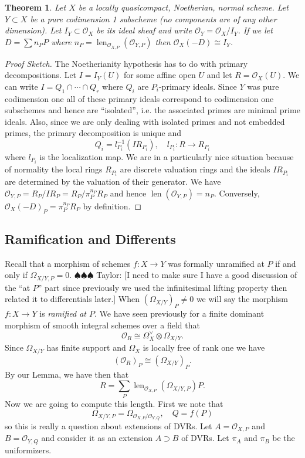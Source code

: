 \documentclass[12pt]{article}
\numberwithin{equation}{section}
\newtheorem{theorem}{Theorem}[subsection]
\theoremstyle{definition}
\theoremstyle{remark}
\newcommand{\Ocal}{\mathcal{O}}
\newcommand{\len}{\operatorname{len}}
\newcommand{\taylor}[1]{{\color{blue} \sf $\spadesuit\spadesuit\spadesuit$ Taylor: [#1]}}
\begin{document}
\begin{theorem}
Let $X$ be a locally quasicompact, Noetherian, normal scheme.
Let $Y \subset X$ be a pure codimension 1 subscheme (no components are of any other dimension).
Let $I_Y \subset \Ocal_X$ be its ideal sheaf and write $\Ocal_Y = \Ocal_X/I_Y$. 
If we let $D = \sum n_P P$ where $n_P = \len_{\Ocal_{X,P}}(\Ocal_{Y,P})$ then $\Ocal_X(-D) \cong I_Y$. 
\end{theorem}
\begin{proof}[Proof Sketch]
	The Noetherianity hypothesis has to do with primary decompositions. 
	Let $I = I_Y(U)$ for some affine open $U$ and let $R=\Ocal_X(U)$.
	We can write $I = Q_1\cap \cdots \cap Q_r$ where $Q_i$ are $P_i$-primary ideals. 
	Since $Y$ was pure codimension one all of these primary ideals correspond to codimension one subschemes and hence are ``isolated'', i.e. the associated primes are minimal prime ideals. 
	Also, since we are only dealing with isolated primes and not embedded primes, the primary decomposition is unique and 
	 $$ Q_i = l_{P_i}^{-1}( I R_{P_i} ), \quad l_{P_i}: R \to R_{P_i} $$
	where $l_{P_i}$ is the localization map.
	We are in a particularly nice situation because of normality the local rings $R_{P_i}$ are discrete valuation rings and the ideals $IR_{P_i}$ are determined by the valuation of their generator.
	We have $\Ocal_{Y,P} = R_P/IR_P=R_P/\pi_P^{n_P}R_P$ and hence $\len(\Ocal_{Y,P})=n_P$. 
	Conversely, $\Ocal_X(-D)_P = \pi_P^{n_P}R_P$ by definition.
\end{proof}

\subsection{Ramification and Differents}
Recall that a morphism of schemes $f:X\to Y$ was formally unramified at $P$ if and only if $\Omega_{X/Y,P}=0$. \taylor{I need to make sure I have a good discussion of the ``at $P$'' part since previously we used the infinitesimal lifting property then related it to differentials later.} 
When $(\Omega_{X/Y})_P\neq 0$ we will say the morphism $f:X\to Y$ is \emph{ramified at $P$}. 
We have seen previously for a finite dominant morphism of smooth integral schemes over a field that 
 $$ \Ocal_R \cong \Omega_X^{\vee} \otimes \Omega_{X/Y}.$$
Since $\Omega_{X/Y}$ has finite support and $\Omega_X$ is locally free of rank one we have 
 $$ (\Ocal_R)_P \cong (\Omega_{X/Y})_P.$$
By our Lemma, we have then that 
 $$ R = \sum_P \len_{\Ocal_{X,P}}( \Omega_{X/Y,P}) P. $$
Now we are going to compute this length. 
First we note that 
 $$ \Omega_{X/Y,P} = \Omega_{\Ocal_{X,P}/\Ocal_{Y,Q}}, \quad Q=f(P) $$
so this is really a question about extensions of DVRs. 
Let $A = \Ocal_{X,P}$ and $B=\Ocal_{Y,Q}$ and consider it as an extension $A\supset B$ of DVRs. 
Let $\pi_A$ and $\pi_B$ be the uniformizers.
\end{document}
